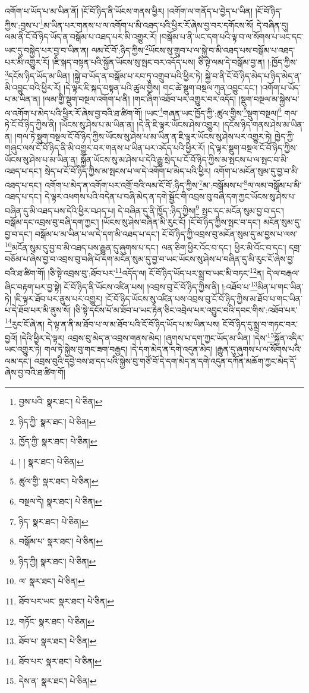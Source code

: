 འགོག་པ་ཡོད་པ་མ་ཡིན་ནོ། །ངོ་བོ་ཉིད་ནི་ཡོངས་གནས་ཕྱིར། །འགོག་ལ་གནོད་པ་བྱེད་པ་ཡིན། །ངོ་བོ་ཉིད་ཀྱིས་:བྱས་པ་\footnote{བྱས་པའི་  སྣར་ཐང་།  པེ་ཅིན། }མ་ཡིན་པར་གནས་པ་ལ་འགོག་པ་མི་འཐད་པའི་ཕྱིར་རོ་ཞེས་བྱ་བར་དགོངས་སོ། དེ་བཞིན་དུ། ལམ་ནི་ངོ་བོ་ཉིད་ཡོད་ན་བསྒོམ་པ་འཐད་པར་མི་འགྱུར་རོ། །བསྒོམ་པ་ནི་ཡང་དག་པའི་ལྟ་བ་ལ་སོགས་པ་ཡང་དང་ཡང་དུ་བསྐྱེད་པར་བྱ་བ་ཡིན་ན། ལམ་ངོ་བོ་:ཉིད་ཀྱིས་\footnote{ཉིད་ཀྱི་  སྣར་ཐང་།  པེ་ཅིན། }ཡོངས་སུ་གྲུབ་པ་ལ་སྐྱེ་བ་མི་འཐད་པས་བསྒོམ་པ་འཐད་པར་མི་འགྱུར་རོ། །ཇི་སྐད་བསྟན་པའི་སྐྱོན་ཡོངས་སུ་སྤང་བར་འདོད་པས། ཅི་སྟེ་ལམ་དེ་བསྒོམ་བྱ་ན། །:ཁྱོད་ཀྱིས་\footnote{ཁྱོད་ཀྱི་  སྣར་ཐང་།  པེ་ཅིན། }དངོས་ཉིད་ཡོད་མ་ཡིན། །སྐྱེ་བ་ཡོད་ན་བསྒོམ་པ་རབ་ཏུ་འགྲུབ་པའི་ཕྱིར་ཏེ། སྐྱེ་བ་ནི་ངོ་བོ་ཉིད་མེད་པ་ཉིད་མེད་ན་མི་འབྱུང་བའི་ཕྱིར་རོ། །དེ་ལྟར་ཇི་སྐད་བསྟན་པའི་ཚུལ་གྱིས། གང་ཚེ་སྡུག་བསྔལ་ཀུན་འབྱུང་དང་། །འགོག་པ་ཡོད་པ་མ་ཡིན་ན། །ལམ་གྱི་སྡུག་བསྔལ་འགོག་པ་ནི། །གང་ཞིག་འཐོབ་པར་འགྱུར་བར་འདོད། །སྡུག་བསྔལ་མ་སྐྱེས་པ་ལ་འགོག་པ་མེད་པའི་ཕྱིར་རོ་ཞེས་བྱ་བའི་ཐ་ཚིག་གོ། །ཡང་\footnote{། །  སྣར་ཐང་།  པེ་ཅིན། }གཞན་ཡང་ཁྱོད་ཀྱི་:ཚུལ་གྱིས་\footnote{ཚུལ་གྱི་  སྣར་ཐང་།  པེ་ཅིན། }སྡུག་བསྔལ།\footnote{བསྔལ་དེ།  སྣར་ཐང་།  པེ་ཅིན། } གལ་ཏེ་ངོ་བོ་ཉིད་ཀྱིས་ནི། །ཡོངས་སུ་ཤེས་པ་མ་ཡིན་ན། །དེ་ནི་ཇི་ལྟར་ཡོངས་ཤེས་འགྱུར། །དངོས་ཉིད་གནས་ཤེས་མ་ཡིན་ན། །གལ་ཏེ་སྡུག་བསྔལ་ངོ་བོ་ཉིད་ཀྱིས་ཡོངས་སུ་ཤེས་པ་མ་ཡིན་ན་ཇི་ལྟར་ཡོངས་སུ་ཤེས་པར་འགྱུར་ཏེ། ཁྱེད་ཀྱི་གཞུང་ལས་ངོ་བོ་ཉིད་ནི་མི་འགྱུར་བར་གནས་པ་ཡིན་པར་འདོད་པའི་ཕྱིར་རོ། །དེ་ལྟར་སྡུག་བསྔལ་ངོ་བོ་ཉིད་ཀྱིས་ཡོངས་སུ་ཤེས་པ་མ་ཡིན་ན། སྐྱོན་ཡོངས་སུ་མ་ཤེས་པ་དེའི་རྒྱུ་སྲེད་པ་ངོ་བོ་ཉིད་ཀྱིས་མ་སྤངས་པ་ལ་སྤང་བ་མི་འཐད་པ་དང་། སྲེད་པ་ངོ་བོ་ཉིད་ཀྱིས་མ་སྤངས་པ་ལ་དེ་འགོག་པ་མེད་པའི་ཕྱིར། འགོག་པ་མངོན་སུམ་དུ་བྱ་བ་མི་འཐད་པ་དང་། འགོག་པ་མེད་ན་འགོག་པར་འགྲོ་བའི་ལམ་ངོ་བོ་:ཉིད་ཀྱིས་\footnote{ཉིད་  སྣར་ཐང་།  པེ་ཅིན། }མ་:བསྒོམས་པ་\footnote{བསྒོམ་པ་  སྣར་ཐང་།  པེ་ཅིན། }ལ་ལམ་བསྒོམ་པ་མི་འཐད་པ་དང་། དེ་ལྟར་འཕགས་པའི་བདེན་པ་བཞི་མེད་ན་དགེ་སྦྱོང་གི་འབྲས་བུ་བཞི་དག་ཀྱང་ཡོངས་སུ་ཤེས་པ་བཞིན་དུ་མི་འཐད་པས་དེའི་ཕྱིར་བཤད་པ། དེ་བཞིན་དུ་ནི་ཁྱོད་:ཉིད་ཀྱིས།\footnote{ཉིད་ཀྱི།  སྣར་ཐང་།  པེ་ཅིན། } སྤང་དང་མངོན་སུམ་བྱ་བ་དང་། བསྒོམ་དང་འབྲས་བུ་བཞི་དག་ཀྱང་། །ཡོངས་སུ་ཤེས་བཞིན་མི་རུང་ངོ། །ངོ་བོ་ཉིད་ཀྱིས་སྤང་བ་དང་། མངོན་སུམ་དུ་བྱ་བ་དང་། བསྒོམ་པ་མ་ཡིན་པ་ལ་དེ་དག་མི་འཐད་པ་དང་། ངོ་བོ་ཉིད་ཀྱི་འབྲས་བུ་མངོན་སུམ་དུ་མ་བྱས་པ་ལས་\footnote{ལ་  སྣར་ཐང་།  པེ་ཅིན། }མངོན་སུམ་དུ་བྱ་བ་མི་འཐད་པས་རྒྱུན་དུ་ཞུགས་པ་དང་། ལན་ཅིག་ཕྱིར་འོང་བ་དང་། ཕྱིར་མི་འོང་བ་དང་། དགྲ་བཅོམ་པ་ཞེས་བྱ་བ་འབྲས་བུ་བཞི་པོ་དག་མངོན་སུམ་དུ་བྱ་བ་ཡང་ཡོངས་སུ་ཤེས་པ་བཞིན་དུ་མི་རུང་ངོ་ཞེས་བྱ་བའི་ཐ་ཚིག་གོ། །ཅི་སྟེ་འབྲས་བུ་:ཐོབ་པར་\footnote{ཐོབ་པར་ཡང་  སྣར་ཐང་།  པེ་ཅིན། }འདོད་ལ། ངོ་བོ་ཉིད་ཡོད་པར་སྨྲ་བ་ཡང་མི་བཏང་\footnote{གཏོང་  སྣར་ཐང་།  པེ་ཅིན། }ན། དེ་ལ་བརྒལ་ཞིང་བརྟག་པར་བྱ་སྟེ། ངོ་བོ་ཉིད་ནི་ཡོངས་འཛིན་པས། །འབྲས་བུ་ངོ་བོ་ཉིད་ཀྱིས་ནི། །:འཐོབ་པ་\footnote{ཐོབ་པ་  སྣར་ཐང་།  པེ་ཅིན། }མིན་པ་གང་ཡིན་ཏེ། །ཇི་ལྟར་ཐོབ་པར་ནུས་པར་འགྱུར། །ངོ་བོ་ཉིད་ཡོངས་སུ་འཛིན་པས་འབྲས་བུ་ངོ་བོ་ཉིད་ཀྱིས་མ་ཐོབ་པ་གང་ཡིན་པ་དེ་ཐོབ་པར་མི་ནུས་སོ། །ཅི་སྟེ་དངོས་པོ་མ་ཐོབ་པ་ཡང་རྟེན་ཅིང་འབྲེལ་པར་འབྱུང་བའི་དབང་གིས་:འཐོབ་པར་\footnote{ཐོབ་པར་  སྣར་ཐང་།  པེ་ཅིན། }རུང་ངོ་ཞེ་ན། དེ་ལྟ་ན་ནི་མ་ཐོབ་པ་ལ་མ་ཐོབ་པའི་ངོ་བོ་ཉིད་ཡོད་པ་མ་ཡིན་པས། ངོ་བོ་ཉིད་དུ་སྨྲ་བ་གཏང་བར་བྱའོ། །དེའི་ཕྱིར་དེ་ལྟར། འབྲས་བུ་མེད་ན་འབྲས་གནས་མེད། །ཞུགས་པ་དག་ཀྱང་ཡོད་མ་ཡིན། །དེས་\footnote{དེས་ན་  སྣར་ཐང་།  པེ་ཅིན། }སྐྱོན་འདིར་ཡང་འགྱུར་ཏེ། གལ་ཏེ་སྐྱེས་བུ་གང་ཟག་བརྒྱད། །དེ་དག་མེད་ན་དགེ་འདུན་མེད། །རྒྱུན་དུ་ཞུགས་པ་ལ་སོགས་པའི་ལམ་དང་། འབྲས་བུའི་དབྱེ་བས་ཐ་དད་པའི་སྐྱེས་བུ་གཙོ་བོ་དེ་དག་མེད་ན་དགེ་འདུན་དཀོན་མཆོག་ཀྱང་མེད་དོ་ཞེས་བྱ་བའི་ཐ་ཚིག་གོ། 